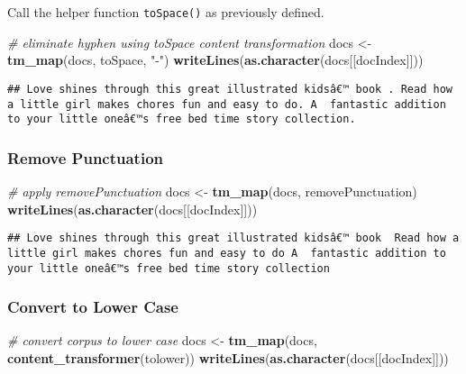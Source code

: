 \documentclass[
]{article}
\newenvironment{Shaded}{\begin{snugshade}}{\end{snugshade}}
\newcommand{\CommentTok}[1]{\textcolor[rgb]{0.56,0.35,0.01}{\textit{#1}}}
\newcommand{\KeywordTok}[1]{\textcolor[rgb]{0.13,0.29,0.53}{\textbf{#1}}}
\newcommand{\NormalTok}[1]{#1}
\newcommand{\StringTok}[1]{\textcolor[rgb]{0.31,0.60,0.02}{#1}}
\begin{document}
Call the helper function \texttt{toSpace()} as previously defined.

\begin{Shaded}
\begin{Highlighting}[]
\CommentTok{# eliminate hyphen using toSpace content transformation}
\NormalTok{docs <-}\StringTok{ }\KeywordTok{tm_map}\NormalTok{(docs, toSpace, }\StringTok{"-"}\NormalTok{)}
\KeywordTok{writeLines}\NormalTok{(}\KeywordTok{as.character}\NormalTok{(docs[[docIndex]]))}
\end{Highlighting}
\end{Shaded}

\begin{verbatim}
## Love shines through this great illustrated kidsâ€™ book . Read how a little girl makes chores fun and easy to do. A  fantastic addition to your little oneâ€™s free bed time story collection.
\end{verbatim}

\hypertarget{remove-punctuation}{%
\subsubsection{Remove Punctuation}\label{remove-punctuation}}

\begin{Shaded}
\begin{Highlighting}[]
\CommentTok{# apply removePunctuation}
\NormalTok{docs <-}\StringTok{ }\KeywordTok{tm_map}\NormalTok{(docs, removePunctuation)}
\KeywordTok{writeLines}\NormalTok{(}\KeywordTok{as.character}\NormalTok{(docs[[docIndex]]))}
\end{Highlighting}
\end{Shaded}

\begin{verbatim}
## Love shines through this great illustrated kidsâ€™ book  Read how a little girl makes chores fun and easy to do A  fantastic addition to your little oneâ€™s free bed time story collection
\end{verbatim}

\hypertarget{convert-to-lower-case}{%
\subsubsection{Convert to Lower Case}\label{convert-to-lower-case}}

\begin{Shaded}
\begin{Highlighting}[]
\CommentTok{# convert corpus to lower case}
\NormalTok{docs <-}\StringTok{ }\KeywordTok{tm_map}\NormalTok{(docs, }\KeywordTok{content_transformer}\NormalTok{(tolower))}
\KeywordTok{writeLines}\NormalTok{(}\KeywordTok{as.character}\NormalTok{(docs[[docIndex]]))}
\end{Highlighting}
\end{Shaded}
\end{document}
